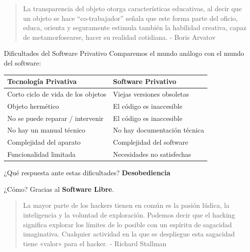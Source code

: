 \documentclass[spanish]{beamer}
\begin{document}
\begin{frame}
    \begin{quote}
        La transparencia del objeto otorga características educativas, al decir que un objeto se hace “co-trabajador” señala que este forma parte del oficio, educa, orienta y seguramente estimula también la habilidad creativa, capaz de metamorfosearse, hacer su realidad cotidiana. - Boris Arvatov
    \end{quote}
\end{frame}

\begin{frame}{Dificultades del Software Privativo}
    \centering
    Comparemos el mundo análogo con el mundo del software:
    \vspace{0.6cm}

    \resizebox{11cm}{!}
    {
    \begin{tabular}{|l|l|}
        \hline
        \rowcolor{lightgray}\textbf{Tecnología Privativa} & \textbf{Software Privativo} \\
        \hline
        \hline
        Corto ciclo de vida de los objetos & Viejas versiones obsoletas \\
        \hline
        Objeto hermético & El código es inaccesible \\
        \hline
        No se puede reparar / intervenir & El código es inaccesible \\
        \hline
        No hay un manual técnico & No hay documentación técnica \\
        \hline
        Complejidad del aparato & Complejidad del software \\
        \hline
        Funcionalidad limitada & Necesidades no satisfechas \\
        \hline
    \end{tabular}
    }

    \vspace{0.6cm}

    ¿Qué respuesta ante estas dificultades? \MVRightArrow{} \textbf{Desobediencia}

    ¿Cómo? Gracias al \textbf{Software Libre}.
\end{frame}

\begin{frame}
    \begin{quote}
        La mayor parte de los hackers tienen en común es la pasión lúdica, la inteligencia y la voluntad de exploración. Podemos decir que el hacking significa explorar los límites de lo posible con un espíritu de sagacidad imaginativa. Cualquier actividad en la que se despliegue esta sagacidad tiene «valor» para el hacker. - Richard Stallman
    \end{quote}
\end{frame}
\end{document}

